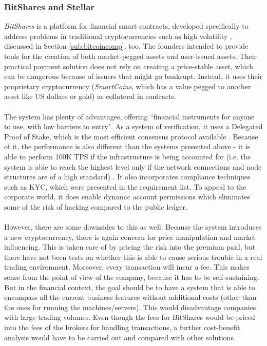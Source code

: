 \documentclass[12pt,twoside]{article}
\begin{document}
\subsubsection{BitShares and Stellar}
\label{sub:BSS}
\textit{BitShares} is a platform for financial smart contracts, developed specifically to address problems in traditional cryptocurrencies such as high volatility \cite{BS:TP}, discussed in Section \ref{sub:bitcoincomp}, too. The founders intended to provide tools for the creation of both market-pegged assets and user-issued assets. Their practical payment solution does not rely on creating a price-stable asset, which can be dangerous because of issuers that might go bankrupt. Instead, it uses their proprietary cryptocurrency (\textit{SmartCoins}, which has a value pegged to another asset like US dollars or gold) as collateral in contracts. 
\\ \\
The system has plenty of advantages, offering ``financial instruments for anyone to use, with low barriers to entry". As a system of verification, it uses a Delegated Proof of Stake, which is the most efficient consensus protocol available \cite{BS:DPOS}. Because of it, the performance is also different than the systems presented above - it is able to perform 100K TPS if the infrastructure is being accounted for (i.e. the system is able to reach the highest level only if the network connections and node structures are of a high standard) \cite{BS:tech}. It also incorporates compliance techniques such as KYC, which were presented in the requirement list. To appeal to the corporate world, it does enable dynamic account permissions which eliminates some of the risk of hacking compared to the public ledger. 
\\ \\
However, there are some downsides to this as well. Because the system introduces a new cryptocurrency, there is again concern for price manipulation and market influencing. This is taken care of by pricing the risk into the premium paid, but there have not been tests on whether this is able to cause serious trouble in a real trading environment. Moreover, every transaction will incur a fee. This makes sense from the point of view of the company, because it has to be self-sustaining. But in the financial context, the goal should be to have a system that is able to encompass all the current business features without additional costs (other than the ones for running the machines/servers). This would disadvantage companies with large trading volumes. Even though the fees for BitShares would be priced into the fees of the brokers for handling transactions, a further cost-benefit analysis would have to be carried out and compared with other solutions.
\end{document}
